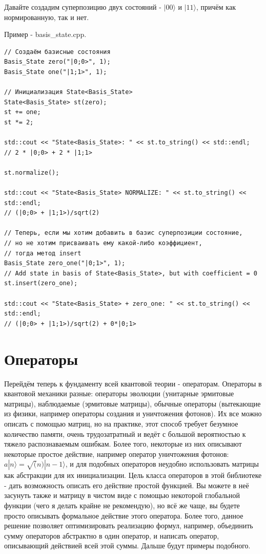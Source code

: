 \documentclass[12pt,fleqn]{article}
\begin{document}
        Давайте создадим суперпозицию двух состояний - $|00\rangle$ и $|11\rangle$, причём как нормированную, так и нет.

        Пример - \textsf{basis\_state.cpp}.
\begin{mdframed}[linecolor=black, topline=true, bottomline=true,
leftline=false, rightline=false]
\begin{verbatim}
// Создаём базисные состояния
Basis_State zero("|0;0>", 1);
Basis_State one("|1;1>", 1);

// Инициализация State<Basis_State>
State<Basis_State> st(zero);
st += one;
st *= 2;

std::cout << "State<Basis_State>: " << st.to_string() << std::endl;
// 2 * |0;0> + 2 * |1;1>

st.normalize();

std::cout << "State<Basis_State> NORMALIZE: " << st.to_string() << std::endl;
// (|0;0> + |1;1>)/sqrt(2)

// Теперь, если мы хотим добавить в базис суперпозиции состояние,
// но не хотим присваивать ему какой-либо коэффициент, 
// тогда метод insert
Basis_State zero_one("|0;1>", 1);
// Add state in basis of State<Basis_State>, but with coefficient = 0
st.insert(zero_one);

std::cout << "State<Basis_State> + zero_one: " << st.to_string() << std::endl;
// (|0;0> + |1;1>)/sqrt(2) + 0*|0;1>

\end{verbatim}
\end{mdframed}
        \section{Операторы}

        Перейдём теперь к фундаменту всей квантовой теории - операторам. Операторы в квантовой механики разные: операторы эволюции (унитарные эрмитовые матрицы), наблюдаемые (эрмитовые матрицы), 
        обычные операторы (вытекающие из физики, например операторы создания и уничтожения фотонов). Их все можно описать с помощью матриц, но на практике, этот способ требует безумное количество памяти, 
        очень трудозатратный и ведёт с большой вероятностью к тяжело распознаваемым ошибкам.
        Более того, некоторые из них описывают некоторые простое действие, например оператор уничтожения фотонов:
        $a|n\rangle = \sqrt(n)|n - 1\rangle$, и для подобных операторов неудобно использовать матрицы как абстракции для их инициализации.
        Цель класса операторов в этой библиотеке - дать возможность описать его действие простой функцией. 
        Вы можете в неё засунуть также и матрицу в чистом виде с помощью некоторой глобальной функции (чего я делать 
        крайне не рекомендую), но всё же чаще, вы будете просто описывать формальное действие этого оператора. Более того, данное решение позволяет оптимизировать реализацию формул, например, объединить 
        сумму операторов абстрактно в один оператор, и написать оператор, описывающий действией всей этой суммы. Дальше будут примеры подобного.
\end{document}

